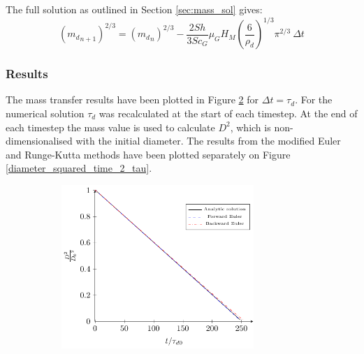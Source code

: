 \documentclass[../Interim_Report_Master]{subfiles}
\begin{document}
The full solution as outlined in Section \ref{sec:mass_sol} gives:
\begin{equation}
\left({m_d}_{n+1}\right)^{2/3} = \left({m_d}_{n}\right)^{2/3} - \frac{2Sh}{3Sc_G}\mu_G H_M \left(\frac{6}{\rho_d}\right)^{1/3}\pi^{2/3} ~ \Delta t
\end{equation}

\subsubsection{Results}
The mass transfer results have been plotted in Figure \ref{diameter_squared_time_tau} for $\Delta t=\tau_d$. For the numerical solution $\tau_d$ was recalculated at the start of each timestep. At the end of each timestep the mass value is used to calculate $D^2$, which is non-dimensionalised with the initial diameter. The results from the modified Euler and Runge-Kutta methods have been plotted separately on Figure \ref{diameter_squared_time_2_tau}.
\begin{figure}[H]
	\centering
	\begin{subfigure}{\textwidth}
		\centering
		\includegraphics[width=0.8\textwidth]{./Diagrams/Uncoupled_D2_Transfer_tau/Uncoupled_D2_Transfer_tau.pdf}
		\caption{}
		\label{diameter_squared_time_tau}
	\end{subfigure}
\end{figure}
\end{document}
